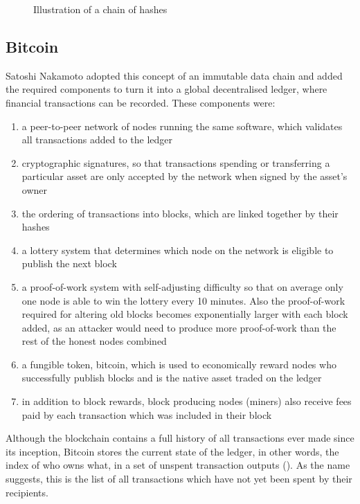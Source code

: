\begin{figure}[h]
    \centering
    \captionsetup{justification=centering}
    
    \caption[Illustration of a chain of hashes]{Illustration of a chain of hashes}
    \label{fig:hashing}
\end{figure}


\subsection{Bitcoin}

Satoshi Nakamoto \cite{nakamotoBitcoinPeertopeerElectronic2008a}  adopted this concept of an immutable data chain and added the required components to turn it into a global decentralised ledger, where financial transactions can be recorded. These components were:

\begin{enumerate}
    \item a peer-to-peer network of nodes running the same software, which validates all transactions added to the ledger 
    \item cryptographic signatures, so that transactions spending or transferring a particular asset are only accepted by the network when signed by the asset's owner
    \item the ordering of transactions into blocks, which are linked together by their hashes
    \item a lottery system that determines which node on the network is eligible to publish the next block
    \item a proof-of-work system with self-adjusting difficulty so that on average only one node is able to win the lottery every 10 minutes. Also the proof-of-work required for altering old blocks becomes exponentially larger with each block added, as an attacker would need to produce more proof-of-work than the rest of the honest nodes combined
    \item a fungible token, bitcoin, which is used to economically reward nodes who successfully publish blocks and is the native asset traded on the ledger
    \item in addition to block rewards, block producing nodes (miners) also receive fees paid by each transaction which was included in their block
\end{enumerate}

\vspace{0.5cm}

Although the blockchain contains a full history of all transactions ever made since its inception, Bitcoin stores the current state of the ledger, in other words, the index of who owns what, in a set of unspent transaction outputs (). As the name suggests, this is the list of all transactions which have not yet been spent by their recipients.

